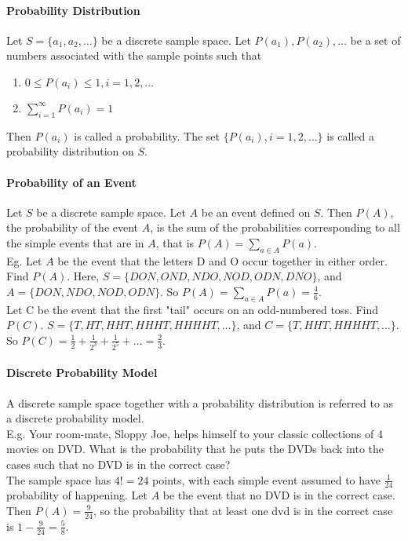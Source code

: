 \documentclass[10pt,letter]{article}
\begin{document}
\paragraph{Probability Distribution}
Let $S=\{a_1,a_2,\ldots\}$ be a discrete sample space. Let $P(a_1),P(a_2),\ldots$ be a set of numbers associated with the sample points such that 
\begin{enumerate}
    \item $0\leq P(a_i)\leq 1, i=1,2,\ldots$
    \item $\sum_{i=1}^\infty P(a_i)=1$
\end{enumerate}
Then $P(a_i)$ is called a probability. The set $\{P(a_i), i=1,2,\ldots\}$ is called a probability distribution on $S$. 

\paragraph{Probability of an Event}
Let $S$ be a discrete sample space. Let $A$ be an event defined on $S$. Then $P(A)$, the probability of the event $A$, is the sum of the probabilities corresponding to all the simple events that are in $A$, that is $P(A)=\sum_{a\in A}P(a)$. \\ 
Eg. Let $A$ be the event that the letters D and O occur together in either order. Find $P(A)$. Here, $S=\{DON,OND,NDO,NOD,ODN,DNO\}$, and $A=\{DON,NDO,NOD,ODN\}$. So $P(A)=\sum_{a\in A}P(a)=\frac{4}{6}$. \\ 
Let C be the event that the first "tail" occurs on an odd-numbered toss. Find $P(C)$. $S=\{T,HT,HHT,HHHT,HHHHT, \ldots\}$, and $C=\{T,HHT,HHHHT,\ldots\}$. So $P(C)=\frac{1}{2}+\frac{1}{2^3}+\frac{1}{2^5}+\ldots=\frac{2}{3}$. 

\paragraph{Discrete Probability Model}
A discrete sample space together with a probability distribution is referred to as a discrete probability model. \\ 
E.g. Your room-mate, Sloppy Joe, helps himself to your classic collections of 4 movies on DVD. What is the probability that he puts the DVDs back into the cases such that no DVD is in the correct case? \\ 
The sample space has $4!=24$ points, with each simple event assumed to have $\frac{1}{24}$ probability of happening. Let $A$ be the event that no DVD is in the correct case. Then $P(A)=\frac{9}{24}$, so the probability that at least one dvd is in the correct case is $1-\frac{9}{24}=\frac{5}{8}$. 
\end{document}
